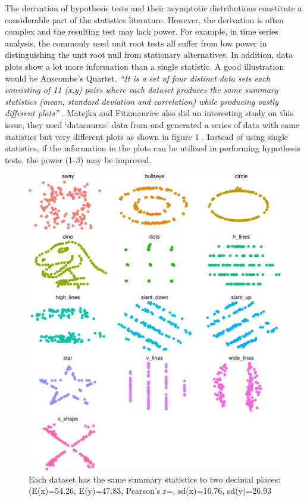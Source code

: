 \documentclass[12pt]{article}
\begin{document}
The derivation of hypothesis tests and their asymptotic distributions
constitute a considerable part of the statistics literature. However,
the derivation is often complex and the resulting test may lack power.
For example, in time series analysis, the commonly used unit root tests
all suffer from low power in distinguishing the unit root null from
stationary alternatives. In addition, data plots show a lot more
information than a single statistic. A good illustration would be
Anscombe's Quartet. \emph{``It is a set of four distinct data sets each
consisting of 11 (x,y) pairs where each dataset produces the same
summary statistics (mean, standard deviation and correlation) while
producing vastly different plots''} \citep{ANS73}. Matejka and
Fitzmaurice also did an interesting study on this issue, they used
`datasaurus' data from \citet{DS16} and generated a series of data with
same statistics but very different plots as shown in figure 1
\citep{JM17}. Instead of using single statistics, if the information in
the plots can be utilized in performing hypothesis tests, the power
(1-\(\beta\)) may be improved.

\begin{figure}
\centering
\includegraphics{pc_plots_files/figure-latex/saurus-1.pdf}
\caption{Each dataset has the same summary statistics to two decimal
places: (E(x)=54.26, E(y)=47.83, Pearson's r=, sd(x)=16.76, sd(y)=26.93}
\end{figure}
\end{document}

